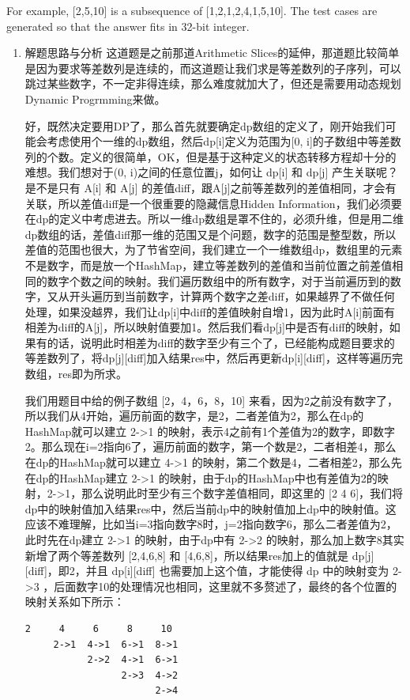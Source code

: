 \documentclass[9pt, b5paaper]{book}
\begin{document}
For example, [2,5,10] is a subsequence of [1,2,1,2,4,1,5,10].
The test cases are generated so that the answer fits in 32-bit integer.
\begin{enumerate}
\item 解题思路与分析
\label{sec-1-4-59-0-1}
这道题是之前那道Arithmetic Slices的延伸，那道题比较简单是因为要求等差数列是连续的，而这道题让我们求是等差数列的子序列，可以跳过某些数字，不一定非得连续，那么难度就加大了，但还是需要用动态规划Dynamic Progrmming来做。

好，既然决定要用DP了，那么首先就要确定dp数组的定义了，刚开始我们可能会考虑使用个一维的dp数组，然后dp[i]定义为范围为[0, i]的子数组中等差数列的个数。定义的很简单，OK，但是基于这种定义的状态转移方程却十分的难想。我们想对于(0, i)之间的任意位置j，如何让 dp[i] 和 dp[j] 产生关联呢？是不是只有 A[i] 和 A[j] 的差值diff，跟A[j]之前等差数列的差值相同，才会有关联，所以差值diff是一个很重要的隐藏信息Hidden Information，我们必须要在dp的定义中考虑进去。所以一维dp数组是罩不住的，必须升维，但是用二维dp数组的话，差值diff那一维的范围又是个问题，数字的范围是整型数，所以差值的范围也很大，为了节省空间，我们建立一个一维数组dp，数组里的元素不是数字，而是放一个HashMap，建立等差数列的差值和当前位置之前差值相同的数字个数之间的映射。我们遍历数组中的所有数字，对于当前遍历到的数字，又从开头遍历到当前数字，计算两个数字之差diff，如果越界了不做任何处理，如果没越界，我们让dp[i]中diff的差值映射自增1，因为此时A[i]前面有相差为diff的A[j]，所以映射值要加1。然后我们看dp[j]中是否有diff的映射，如果有的话，说明此时相差为diff的数字至少有三个了，已经能构成题目要求的等差数列了，将dp[j][diff]加入结果res中，然后再更新dp[i][diff]，这样等遍历完数组，res即为所求。

我们用题目中给的例子数组 [2，4，6，8，10] 来看，因为2之前没有数字了，所以我们从4开始，遍历前面的数字，是2，二者差值为2，那么在dp\footnotemark[2]{}的HashMap就可以建立 2->1 的映射，表示4之前有1个差值为2的数字，即数字2。那么现在i=2指向6了，遍历前面的数字，第一个数是2，二者相差4，那么在dp\footnotemark[3]{}的HashMap就可以建立 4->1 的映射，第二个数是4，二者相差2，那么先在dp\footnotemark[3]{}的HashMap建立 2->1 的映射，由于dp\footnotemark[2]{}的HashMap中也有差值为2的映射，2->1，那么说明此时至少有三个数字差值相同，即这里的 [2 4 6]，我们将dp\footnotemark[2]{}中的映射值加入结果res中，然后当前dp\footnotemark[3]{}中的映射值加上dp\footnotemark[2]{}中的映射值。这应该不难理解，比如当i=3指向数字8时，j=2指向数字6，那么二者差值为2，此时先在dp\footnotemark[4]{}建立 2->1 的映射，由于dp\footnotemark[3]{}中有 2->2 的映射，那么加上数字8其实新增了两个等差数列 [2,4,6,8] 和 [4,6,8]，所以结果res加上的值就是 dp[j][diff]，即2，并且 dp[i][diff] 也需要加上这个值，才能使得 dp\footnotemark[4]{} 中的映射变为 2->3 ，后面数字10的处理情况也相同，这里就不多赘述了，最终的各个位置的映射关系如下所示：
\begin{verbatim}
2     4     6     8     10    
     2->1  4->1  6->1  8->1
           2->2  4->1  6->1 
                 2->3  4->2
                       2->4
\end{verbatim}


\end{enumerate}
\end{document}
